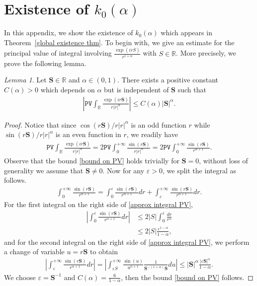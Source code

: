 \documentclass[reqno]{amsart}%
\theoremstyle{definition}
\theoremstyle{remark}
\numberwithin{equation}{section}
\newtheorem{lemma}[theorem]{Lemma}
\newcommand{\0}{\mathbf{0}}
\newcommand{\1}{\mathbf{1}}
\newcommand{\R}{\mathbb R}
\newcommand{\PV}{\texttt{PV}}
\numberwithin{equation}{section}
\numberwithin{theorem}{section}
\numberwithin{figure}{section}
\begin{document}
\appendix

\section{Existence of $k_0(\alpha)$}\label{existence of k0 and estimates on principal values sec}

In this appendix, we show the existence of $k_0(\alpha)$ which appears in Theorem~\ref{global existence thm}. To begin with, we give an estimate for the principal value of integral involving $\frac{\exp(irS)}{r^{1+\alpha}}$ with $S\in\R$. More precisely, we prove the following lemma.

\begin{lemma}\label{estimates on PV lem}
Let $\mathbf{S}\in\R$ and $\alpha\in(0,1)$. There exists a positive constant $C(\alpha)>0$ which depends on $\alpha$ but is independent of $\mathbf{S}$ such that
\begin{align}\label{bound on PV} 
 \left|\PV\int_{\R}\frac{\exp(i r \mathbf{S})}{r|r|^{\alpha}} \right|\leq C(\alpha)|\mathbf{S}|^{\alpha}.
\end{align}
\end{lemma}
\begin{proof}
Notice that since $\cos(r\mathbf{S})/{r|r|^{\alpha}}$ is an odd function $r$ while $\sin(r\mathbf{S})/{r|r|^{\alpha}}$ is an even function in $r$, we readily have
\begin{align*}
 \PV\int_{\R}\frac{\exp(i r \mathbf{S})}{r|r|^{\alpha}}= 2\PV\int_{0}^{+\infty}\frac{\sin(r \mathbf{S})}{r|r|^{\alpha}}=2\PV\int_{0}^{+\infty}\frac{\sin(r \mathbf{S})}{r^{\alpha+1}}.
\end{align*}
Observe that the bound \eqref{bound on PV} holds trivially for $\mathbf{S}=0$, without loss of generality we assume that $\mathbf{S}\neq0$. Now for any $\varepsilon>0$, we split the integral as follows.
\begin{align}\label{approx integral PV}
\int_{0}^{+\infty}\frac{\sin(r \mathbf{S})}{r^{\alpha+1}}=\int_{0}^{\varepsilon}\frac{\sin(r \mathbf{S})}{r^{\alpha+1}}dr+\int_{\varepsilon}^{+\infty}\frac{\sin(r \mathbf{S})}{r^{\alpha+1}}dr.
\end{align}
For the first integral on the right side of \eqref{approx integral PV},
\begin{align*}
\left|\int_{0}^{\varepsilon}\frac{\sin(r \mathbf{S})}{r^{\alpha+1}}dr\right|&\le 2|S|\int_{0}^{\varepsilon}\frac{dr}{r^\alpha}\\
&\le 2|S|\frac{\varepsilon^{1-\alpha}}{1-\alpha},
\end{align*}
and for the second integral on the right side of \eqref{approx integral PV}, we perform a change of variable $u=r\mathbf{S}$ to obtain
\begin{align*}
\left|\int_{\varepsilon}^{+\infty}\frac{\sin(r \mathbf{S})}{r^{\alpha+1}}dr\right|=\left|\int_{\varepsilon S}^{+\infty}\frac{\sin(u)}{u^{\alpha+1}}\frac{1}{\mathbf{S}^{-(1+\alpha)}\mathbf{S}}du\right|\le |\mathbf{S}|^\alpha\frac{|\varepsilon\mathbf{S}|^\alpha}{1-\alpha}.
\end{align*}
We choose $\varepsilon=\mathbf{S}^{-1}$ and $C(\alpha)=\frac{6}{1-\alpha}$, then the bound \eqref{bound on PV} follows.
\end{proof}
\end{document}

